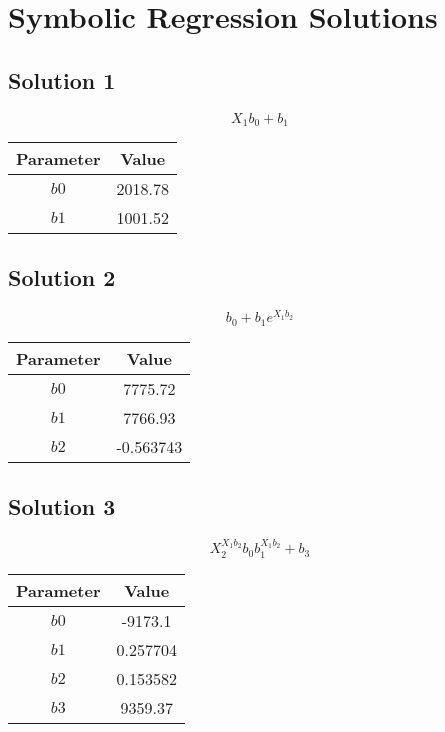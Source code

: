\documentclass{article}
\begin{document}
        \section*{Symbolic Regression Solutions}
        \subsection*{Solution 1}
\[
X_{1} b_{0} + b_{1}
\]
\begin{center}
\begin{tabular}{cc}
\toprule
Parameter & Value \\
\midrule
$b0$ & 2018.78 \\
$b1$ & 1001.52 \\
\bottomrule
\end{tabular}
\end{center}

\vspace{1em}
\subsection*{Solution 2}
\[
b_{0} + b_{1} e^{X_{1} b_{2}}
\]
\begin{center}
\begin{tabular}{cc}
\toprule
Parameter & Value \\
\midrule
$b0$ & 7775.72 \\
$b1$ & 7766.93 \\
$b2$ & -0.563743 \\
\bottomrule
\end{tabular}
\end{center}

\vspace{1em}
\subsection*{Solution 3}
\[
X_{2}^{X_{1} b_{2}} b_{0} b_{1}^{X_{1} b_{2}} + b_{3}
\]
\begin{center}
\begin{tabular}{cc}
\toprule
Parameter & Value \\
\midrule
$b0$ & -9173.1 \\
$b1$ & 0.257704 \\
$b2$ & 0.153582 \\
$b3$ & 9359.37 \\
\bottomrule
\end{tabular}
\end{center}

\vspace{1em}
\end{document}
